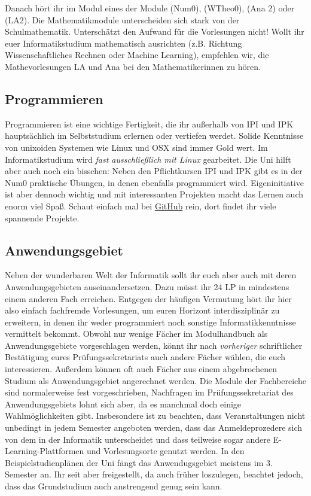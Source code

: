 Danach hört ihr im Modul  eines der Module  (\gls{Num0}),  (\gls{WTheo0}),  (\gls{Ana} 2) oder  (\gls{LA}2). Die Mathematikmodule unterscheiden sich stark von der Schulmathematik. Unterschätzt den Aufwand für die Vorlesungen nicht! Wollt ihr euer Informatikstudium mathematisch ausrichten (z.B. Richtung Wissenschaftliches Rechnen oder Machine Learning), empfehlen wir, die Mathevorlesungen \gls{LA} und \gls{Ana} bei den Mathematikerinnen zu hören.

\subsection{Programmieren}

Programmieren ist eine wichtige Fertigkeit, die ihr außerhalb von \gls{IPI} und \gls{IPK} hauptsächlich im Selbststudium erlernen oder vertiefen werdet. Solide Kenntnisse von unixoiden Systemen wie Linux und OSX sind immer Gold wert. Im Informatikstudium wird \emph{fast ausschließlich mit Linux} gearbeitet. Die Uni hilft aber auch noch ein bisschen: Neben den Pflichtkursen \gls{IPI} und \gls{IPK} gibt es in der \gls{Num0} praktische Übungen, in denen ebenfalls programmiert wird. Eigeninitiative ist aber dennoch wichtig und mit interessanten Projekten macht das Lernen auch enorm viel Spaß. Schaut einfach mal bei \href{https://github.com}{GitHub} rein, dort findet ihr viele spannende Projekte.

\subsection{Anwendungsgebiet}

Neben der wunderbaren Welt der Informatik sollt ihr euch aber auch mit deren Anwendungsgebieten auseinandersetzen. Dazu müsst ihr 24 \gls{LP} in mindestens einem anderen Fach erreichen. Entgegen der häufigen Vermutung hört ihr hier also einfach fachfremde Vorlesungen, um euren Horizont interdisziplinär zu erweitern, in denen ihr weder programmiert noch sonstige Informatikkenntnisse vermittelt bekommt. Obwohl nur wenige Fächer im Modulhandbuch als Anwendungsgebiete vorgeschlagen werden, könnt ihr nach \emph{vorheriger} schriftlicher Bestätigung eures Prüfungssekretariats auch andere Fächer wählen, die euch interessieren. Außerdem können oft auch Fächer aus einem abgebrochenen Studium als Anwendungsgebiet angerechnet werden. Die Module der Fachbereiche sind normalerweise fest vorgeschrieben, Nachfragen im Prüfungssekretariat des Anwendungsgebiets lohnt sich aber, da es manchmal doch einige Wahlmöglichkeiten gibt. Insbesondere ist zu beachten, dass Veranstaltungen nicht unbedingt in jedem Semester angeboten werden, dass das Anmeldeprozedere sich von dem in der Informatik unterscheidet und dass teilweise sogar andere E-Learning-Plattformen und Vorlesungsorte genutzt werden. In den Beispielstudienplänen der Uni fängt das Anwendugsgebiet meistens im 3. Semester an. Ihr seit aber freigestellt, da auch früher loszulegen, beachtet jedoch, dass das Grundstudium auch anstrengend genug sein kann.

